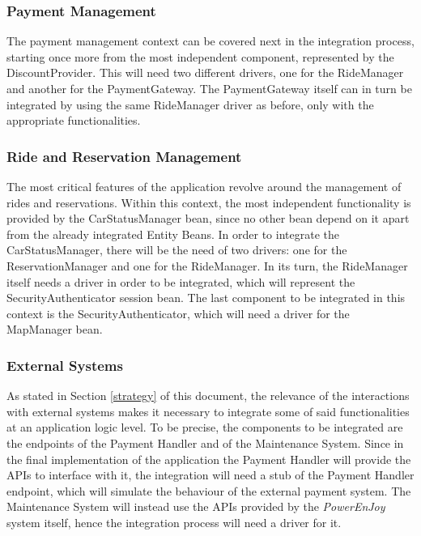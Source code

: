 \subsubsection{Payment Management}
The payment management context can be covered next in the integration process, starting once more from the most independent component, represented by the DiscountProvider. This will need two different drivers, one for the RideManager and another for the PaymentGateway.
\noindent
The PaymentGateway itself can in turn be integrated by using the same RideManager driver as before, only with the appropriate functionalities.

\subsubsection{Ride and Reservation Management}
The most critical features of the application revolve around the management of rides and reservations. Within this context, the most independent functionality is provided by the CarStatusManager bean, since no other bean depend on it apart from the already integrated Entity Beans. In order to integrate the CarStatusManager, there will be the need of two drivers: one for the ReservationManager and one for the RideManager.
\noindent
In its turn, the RideManager itself needs a driver in order to be integrated, which will represent the SecurityAuthenticator session bean.
\noindent
The last component to be integrated in this context is the SecurityAuthenticator, which will need a driver for the MapManager bean.

\subsubsection{External Systems}
As stated in Section \ref{strategy} of this document, the relevance of the interactions with external systems makes it necessary to integrate some of said functionalities at an application logic level.
\noindent
To be precise, the components to be integrated are the endpoints of the Payment Handler and of the Maintenance System. Since in the final implementation of the application the Payment Handler will provide the APIs to interface with it, the integration will need a stub of the Payment Handler endpoint, which will simulate the behaviour of the external payment system. The Maintenance System will instead use the APIs provided by the \textit{PowerEnJoy} system itself, hence the integration process will need a driver for it.

